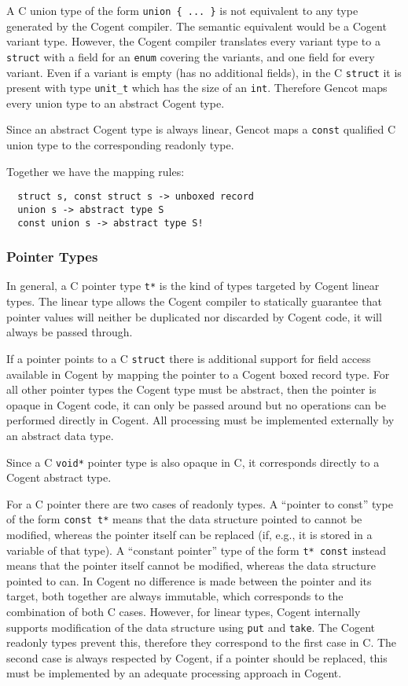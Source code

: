 \documentclass[a4paper]{report}
\newcommand{\code}[1]{\textnormal{\texttt{#1}}}
\begin{document}
A C union type of the form \code{union \{ ... \}} is not equivalent to any type generated by the Cogent compiler.
The semantic equivalent would be a Cogent variant type. However, the Cogent compiler translates every variant type
to a \code{struct} with a field for an \code{enum} covering the variants, and one field for every variant. Even if a variant
is empty (has no additional fields), in the C \code{struct} it is present with type \code{unit\_t} which
has the size of an \code{int}. Therefore Gencot maps every union type to an abstract Cogent type.

Since an abstract Cogent type is always linear, Gencot maps a \code{const} qualified C union type to the corresponding
readonly type.

Together we have the mapping rules:
\begin{verbatim}
  struct s, const struct s -> unboxed record
  union s -> abstract type S
  const union s -> abstract type S!
\end{verbatim}

\subsubsection{Pointer Types}

In general, a C pointer type \code{t*} is the kind of types targeted by Cogent linear types. The linear type 
allows the Cogent compiler to statically guarantee that pointer values will neither be duplicated nor 
discarded by Cogent code, it will always be passed through. 

If a pointer points to a C \code{struct} there is additional support for field access available in Cogent by 
mapping the pointer to a Cogent boxed record type. For all other pointer types the Cogent type must be abstract, 
then the pointer is opaque in Cogent code, it can only be passed around but no operations can be performed 
directly in Cogent. All processing must be implemented externally by an abstract data type.

Since a C \code{void*} pointer type is also opaque in C, it corresponds directly to a Cogent abstract type.

For a C pointer there are two cases of readonly types. A ``pointer to const'' type of the form \code{const t*}
means that the data structure pointed to cannot be modified, whereas the pointer itself can be replaced 
(if, e.g., it is stored in a variable of that type). A ``constant pointer'' type of the form \code{t* const}
instead means that the pointer itself cannot be modified, whereas the data structure pointed to can. In Cogent 
no difference is made between the pointer and its target, both together are always immutable, which corresponds 
to the combination of both C cases. However, for linear types, Cogent internally supports modification of the
data structure using \code{put} and \code{take}. The Cogent readonly types prevent this, therefore they correspond
to the first case in C. The second case is always respected by Cogent, if a pointer should be replaced, this 
must be implemented by an adequate processing approach in Cogent. 
\end{document}
